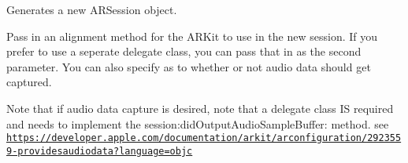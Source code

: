 Generates a new A\+R\+Session object.

Pass in an alignment method for the A\+R\+Kit to use in the new session. If you prefer to use a seperate delegate class, you can pass that in as the second parameter. You can also specify as to whether or not audio data should get captured.

Note that if audio data capture is desired, note that a delegate class IS required and needs to implement the session\+:did\+Output\+Audio\+Sample\+Buffer\+: method. see \href{https://developer.apple.com/documentation/arkit/arconfiguration/2923559-providesaudiodata?language=objc}{\tt https\+://developer.\+apple.\+com/documentation/arkit/arconfiguration/2923559-\/providesaudiodata?language=objc} 